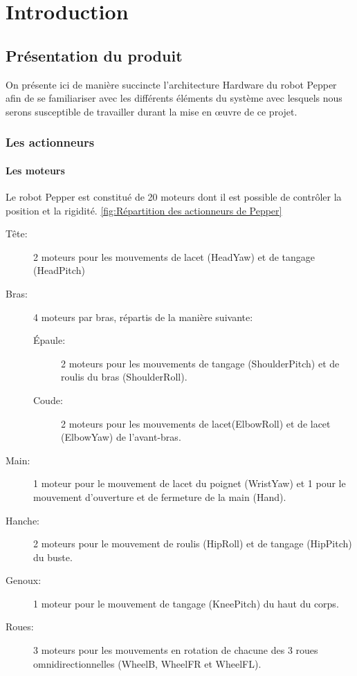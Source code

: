 \chapter{Introduction}
\label{Introduction}
\thispagestyle{fancy}

\section{Présentation du produit}
\label{Introduction:Présentation du produit}
On présente ici de manière succincte l'architecture Hardware du robot Pepper afin de se familiariser avec les différents éléments du système avec lesquels nous serons susceptible de travailler durant la mise en œuvre de ce projet.  

\subsection{Les actionneurs}
\label{Introduction:Présentation du produit:Les actionneurs}
\subsubsection{Les moteurs}
\label{Introduction:Présentation du produit:Les actionneurs: Les moteurs}
Le robot Pepper est constitué de 20 moteurs dont il est possible de contrôler la position et la rigidité. \ref*{fig:Répartition des actionneurs de Pepper}
\begin{description}
	\item [Tête:] 2 moteurs pour les mouvements de lacet (HeadYaw) et de tangage (HeadPitch)
	\item [Bras:] 4 moteurs par bras, répartis de la manière suivante: 
	\begin{description}
		\item [Épaule:] 2 moteurs pour les mouvements de tangage (ShoulderPitch) et de roulis du bras (ShoulderRoll).
		\item [Coude:] 2 moteurs pour les mouvements de lacet(ElbowRoll) et de lacet (ElbowYaw) de l'avant-bras.
	\end{description}
	\item [Main:] 1 moteur pour le mouvement de lacet du poignet (WristYaw) et 1 pour le mouvement d'ouverture et de fermeture de la main (Hand).
	\item [Hanche:] 2 moteurs pour le mouvement de roulis (HipRoll) et de tangage (HipPitch) du buste.
	\item [Genoux:] 1 moteur pour le mouvement de tangage (KneePitch) du haut du corps.
	\item [Roues:] 3 moteurs pour les mouvements en rotation de chacune des 3 roues omnidirectionnelles (WheelB, WheelFR et WheelFL).
\end{description}

